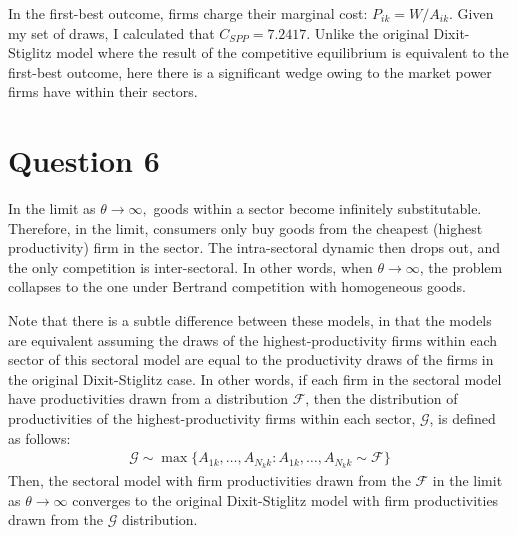 \documentclass[11pt]{article} %
\begin{document}
In the first-best outcome, firms charge their marginal cost: $P_{ik} = W/A_{ik}$. Given my set of draws, I calculated that $C_{SPP} = 7.2417$. Unlike the original Dixit-Stiglitz model where the result of the competitive equilibrium is equivalent to the first-best outcome, here there is a significant wedge owing to the market power firms have within their sectors.
\section{Question 6}
In the limit as $\theta \rightarrow \infty,$ goods within a sector become infinitely substitutable. Therefore, in the limit, consumers only buy goods from the cheapest (highest productivity) firm in the sector. The intra-sectoral dynamic then drops out, and the only competition is inter-sectoral. In other words, when $\theta \rightarrow \infty$, the problem  collapses to the one under Bertrand competition with homogeneous goods.

Note that there is a subtle difference between these models, in that the models are equivalent assuming the draws of the highest-productivity firms within each sector of this sectoral model are equal to the productivity draws of the firms in the original Dixit-Stiglitz case. In other words, if each firm in the sectoral model have productivities drawn from a distribution $\mathcal{F}$, then the distribution of productivities of the highest-productivity firms within each sector, $\mathcal{G}$, is defined as follows:
\begin{align*}
\mathcal{G} \sim \max \{ A_{1k},\dots,A_{N_k k}: A_{1k},\dots, A_{N_k k} \sim \mathcal{F} \}
\end{align*}
Then, the sectoral model with firm productivities drawn from the $\mathcal{F}$ in the limit as $\theta \rightarrow \infty$ converges to the original Dixit-Stiglitz model with firm productivities drawn from the $\mathcal{G}$ distribution.
\end{document}
